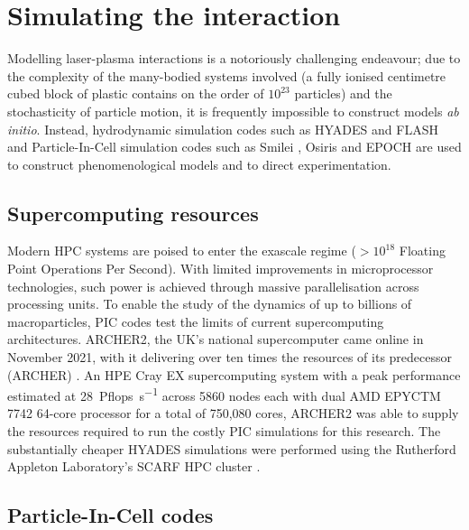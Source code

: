 
\section{Simulating the interaction}
Modelling laser-plasma interactions is a notoriously challenging endeavour; due to the complexity of the many-bodied systems involved (a fully ionised centimetre cubed block of plastic contains on the order of $10^23$ particles) and the stochasticity of particle motion, it is frequently impossible to construct models \textit{ab initio}. Instead, hydrodynamic simulation codes such as HYADES \cite{larsenHYADESPlasmaHydrodynamics1994} and FLASH \cite{fryxellFLASHAdaptiveMesh2000} and Particle-In-Cell simulation codes such as Smilei \cite{derouillatSmileiCollaborativeOpensource2018}, Osiris \cite{fonsecaOSIRISThreeDimensionalFully2002} and EPOCH \cite{bennett2017users} are used to construct phenomenological models and to direct experimentation. 

\subsection{Supercomputing resources}\label{sec:intro-archer}
Modern \ac{HPC} systems are poised to enter the exascale regime ($> 10^{18}$ Floating Point Operations Per Second). With limited improvements in microprocessor technologies, such power is achieved through massive parallelisation across processing units. To enable the study of the dynamics of up to billions of macroparticles, PIC codes test the limits of current supercomputing architectures. ARCHER2, the UK's national supercomputer came online in November 2021, with it delivering over ten times the resources of its predecessor (ARCHER) \cite{ARCHER2}. An HPE Cray EX supercomputing system with a peak performance estimated at \qty{28}{Pflops.s^{-1}} across 5860 nodes each with dual AMD EPYCTM 7742 64-core processor for a total of 750,080 cores, ARCHER2 was able to supply the resources required to run the costly PIC simulations for this research. The substantially cheaper HYADES simulations were performed using the Rutherford Appleton Laboratory's SCARF \ac{HPC} cluster \cite{SCARFOverview}.

\subsection{Particle-In-Cell codes}

